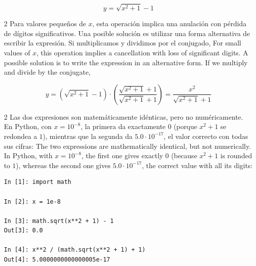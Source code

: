 \begin{equation*}
y=\sqrt{x^2+1}-1
\end{equation*}
\begin{paracol}{2}
Para valores pequeños de $x$, esta operación implica una anulación con pérdida de dígitos significativos. Una posible solución es utilizar una forma alternativa de escribir la expresión. Si multiplicamos y dividimos por el conjugado,
\switchcolumn
For small values of $x$, this operation implies a cancellation with loss of significant digits. A possible solution is to write the expression in an alternative form. If we multiply and divide by the conjugate,
\end{paracol}
\begin{equation*}
y=(\sqrt{x^2+1}-1)\cdot\left(\frac{\sqrt{x^2+1}+1}{\sqrt{x^2+1}+1}\right)=\frac{x^2}{\sqrt{x^2+1}+1}
\end{equation*}
\begin{paracol}{2}
Las dos expresiones son matemáticamente idénticas, pero no numéricamente. En Python, con $x=10^{-8}$, la primera da exactamente $0$ (porque $x^2+1$ se redondea a $1$), mientras que la segunda da $5.0\cdot10^{-17}$, el valor correcto con todas sus cifras:
\switchcolumn
The two expressions are mathematically identical, but not numerically. In Python, with $x=10^{-8}$, the first one gives exactly $0$ (because $x^2+1$ is rounded to $1$), whereas the second one gives $5.0\cdot10^{-17}$, the correct value with all its digits:
\end{paracol}
\begin{verbatim}
In [1]: import math

In [2]: x = 1e-8

In [3]: math.sqrt(x**2 + 1) - 1
Out[3]: 0.0

In [4]: x**2 / (math.sqrt(x**2 + 1) + 1)
Out[4]: 5.0000000000000005e-17
\end{verbatim}

